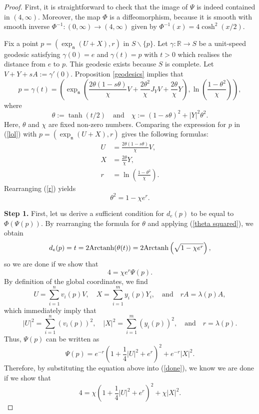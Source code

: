 \documentclass{amsart}
\newcommand{\R}{\mathbb R}
\newcommand{\arctanh}{\text{\normalfont Arctanh}}
\newcommand{\n}{\mathfrak n}
\theoremstyle{plain}
\theoremstyle{definition}
\theoremstyle{remark}
\begin{document}
	\begin{proof}
		First, it is straightforward to check that the image of $\Psi$ is indeed contained in $(4,\infty)$. Moreover, the map $\Phi$ is a diffeomorphism, because it is smooth with smooth inverse $\Phi^{-1}:(0,\infty)\rightarrow(4,\infty)$ given by $ \Phi^{-1}(x) = 4\cosh^2(x/2)$.
		
		Fix a point $p = (\exp_\n(U+X),r)$ in $S\backslash\{p\}$. 
		Let $\gamma:\R \rightarrow S$ be a unit-speed geodesic satisfying $\gamma(0) = e$ and $\gamma(t) = p$ with $t > 0$ which realises the distance from $e$ to $p$. This geodesic exists because $S$ is complete. 
		Let $V + Y + sA := \gamma'(0)$. Proposition \ref{geodesics} implies that 
		\begin{equation}
			p = \gamma(t) = \left( \exp_\n\left(\frac{2\theta(1-s\theta)}{\chi}V + \frac{2\theta^2}{\chi} J_Y V + \frac{2\theta}{\chi} Y\right), \ln\left(\frac{1-\theta^2}{\chi}\right)\right), \label{lol}
		\end{equation}
		where $$\theta := \tanh(t/2) \quad \text{and} \quad \chi := (1-s\theta)^2 + |Y|^2 \theta^2.$$ Here, $\theta$ and $\chi$ are fixed non-zero numbers. Comparing the expression for $p$ in (\ref{lol}) with $p = (\exp_\n(U+X),r)$ gives the following formulas:
		\begin{align}
			U &= \frac{2\theta(1-s\theta)}{\chi} V, \label{U}\\	
			X &= \frac{2\theta }{\chi} Y, \label{X}\\
			r &= \ln\left(\frac{1-\theta^2}{\chi}\right). \label{r}
		\end{align}
		Rearranging (\ref{r}) yields
		\begin{equation}
			\theta^2 = 1- \chi e^r. \label{theta squared}
		\end{equation}
	
		\textbf{Step 1.} First, let us derive a sufficient condition for $d_e(p)$ to be equal to $ \Phi(\Psi(p))$. By rearranging the formula for $\theta$ and applying (\ref{theta squared}), we obtain
		$$d_e(p) = t = 2 \arctanh(\theta(t)) = 2 \arctanh\left(\sqrt{1-\chi e^r}\right),$$
		so we are done if we show that 
		\begin{equation}
			4 = \chi e^r \Psi(p). \label{done}
		\end{equation}
		By definition of the global coordinates, we find
		$$U = \sum_{i=1}^n v_i(p)V, \quad X = \sum_{i=1}^m y_i(p) Y_i,\quad \text{and} \quad rA = \lambda(p) A,$$
		which immediately imply that 
		$$|U|^2 = \sum_{i=1}^n (v_i(p))^2, \quad |X|^2 = \sum_{i=1}^m (y_i(p))^2, \quad \text{and} \quad r = \lambda(p).$$
		Thus, $\Psi(p)$ can be written as 
		$$
			\Psi(p) = e^{-r} \left(1 + \frac14 |U|^2 + e^r\right)^2 + e^{-r} |X|^2. \label{psi}
		$$
		Therefore, by substituting the equation above into (\ref{done}), we know we are done if we show that
		\begin{equation}
			\boxed{4=  \chi\left(1 + \frac14 |U|^2 + e^r\right)^2 + \chi |X|^2. \label{epic}}
		\end{equation}
		

\end{proof}
\end{document}

